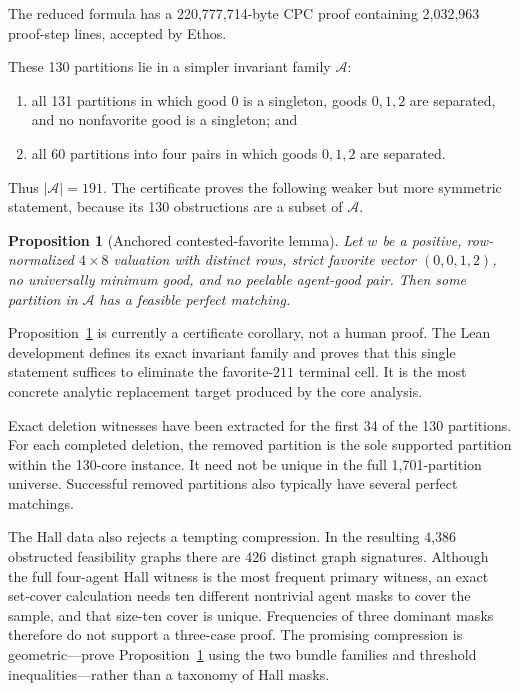 \documentclass[11pt]{article}
\newtheorem{proposition}[theorem]{Proposition}
\theoremstyle{definition}
\begin{document}
The reduced formula has a 220,777,714-byte CPC proof containing 2,032,963
proof-step lines, accepted by Ethos.

These 130 partitions lie in a simpler invariant family $\mathcal A$:
\begin{enumerate}[leftmargin=2.1em]
  \item all 131 partitions in which good $0$ is a singleton, goods
  $0,1,2$ are separated, and no nonfavorite good is a singleton; and
  \item all 60 partitions into four pairs in which goods $0,1,2$ are
  separated.
\end{enumerate}
Thus $|\mathcal A|=191$. The certificate proves the following weaker but
more symmetric statement, because its 130 obstructions are a subset of
$\mathcal A$.

\begin{proposition}[Anchored contested-favorite lemma]
\label{prop:anchored}
Let $w$ be a positive, row-normalized $4\times8$ valuation with distinct
rows, strict favorite vector $(0,0,1,2)$, no universally minimum good, and no
peelable agent-good pair. Then some partition in $\mathcal A$ has a feasible
perfect matching.
\end{proposition}

Proposition~\ref{prop:anchored} is currently a certificate corollary, not a
human proof. The Lean development defines its exact invariant family and
proves that this single statement suffices to eliminate the favorite-$211$
terminal cell. It is the most concrete analytic replacement target produced
by the core analysis.

Exact deletion witnesses have been extracted for the first 34 of the 130
partitions.
For each completed deletion, the removed partition is the sole supported
partition within the 130-core instance. It need not be unique in the full
1,701-partition universe. Successful removed partitions also typically have
several perfect matchings.

The Hall data also rejects a tempting compression. In the resulting 4,386
obstructed feasibility graphs there are 426 distinct graph signatures.
Although the full four-agent Hall witness is the most frequent primary
witness, an exact set-cover calculation needs ten different nontrivial agent
masks to cover the sample, and that size-ten cover is unique. Frequencies of
three dominant masks therefore do not support a three-case proof. The
promising compression is geometric---prove
Proposition~\ref{prop:anchored} using the two bundle families and threshold
inequalities---rather than a taxonomy of Hall masks.
\end{document}
